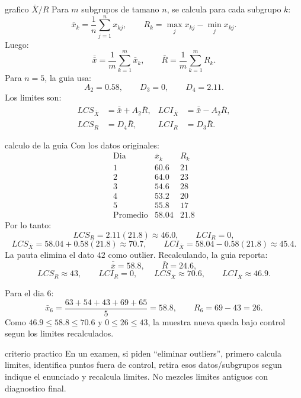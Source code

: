 \begin{materia}{grafico $\bar X/R$}
Para $m$ subgrupos de tamano $n$, se calcula para cada subgrupo $k$:
\[
  \bar x_k=\frac{1}{n}\sum_{j=1}^{n}x_{kj},
  \qquad
  R_k=\max_j x_{kj}-\min_j x_{kj}.
\]
Luego:
\[
  \bar{\bar x}=\frac{1}{m}\sum_{k=1}^{m}\bar x_k,
  \qquad
  \bar R=\frac{1}{m}\sum_{k=1}^{m}R_k.
\]
Para $n=5$, la guia usa:
\[
  A_2=0.58,\qquad D_3=0,\qquad D_4=2.11.
\]
Los limites son:
\[
\begin{aligned}
LCS_{\bar X}&=\bar{\bar x}+A_2\bar R, &
LCI_{\bar X}&=\bar{\bar x}-A_2\bar R,\\
LCS_R&=D_4\bar R, &
LCI_R&=D_3\bar R.
\end{aligned}
\]
\end{materia}

\begin{solucion}{calculo de la guia}
Con los datos originales:
\[
\begin{array}{c|cc}
\text{Dia} & \bar x_k & R_k\\
\hline
1&60.6&21\\
2&64.0&23\\
3&54.6&28\\
4&53.2&20\\
5&55.8&17\\
\hline
\text{Promedio}&58.04&21.8
\end{array}
\]
Por lo tanto:
\[
  LCS_R=2.11(21.8)\approx 46.0,\qquad LCI_R=0,
\]
\[
  LCS_{\bar X}=58.04+0.58(21.8)\approx 70.7,\qquad
  LCI_{\bar X}=58.04-0.58(21.8)\approx 45.4.
\]
La pauta elimina el dato $42$ como outlier. Recalculando, la guia reporta:
\[
  \bar{\bar x}=58.8,\qquad \bar R=24.6,
\]
\[
  LCS_R\approx 43,\qquad LCI_R=0,\qquad
  LCS_{\bar X}\approx 70.6,\qquad LCI_{\bar X}\approx 46.9.
\]

Para el dia 6:
\[
  \bar x_6=\frac{63+54+43+69+65}{5}=58.8,
  \qquad
  R_6=69-43=26.
\]
Como $46.9\le 58.8\le 70.6$ y $0\le 26\le 43$, la muestra nueva queda bajo control segun los limites recalculados.
\end{solucion}

\begin{alerta}{criterio practico}
En un examen, si piden ``eliminar outliers'', primero calcula limites, identifica puntos fuera de control, retira esos datos/subgrupos segun indique el enunciado y recalcula limites. No mezcles limites antiguos con diagnostico final.
\end{alerta}
